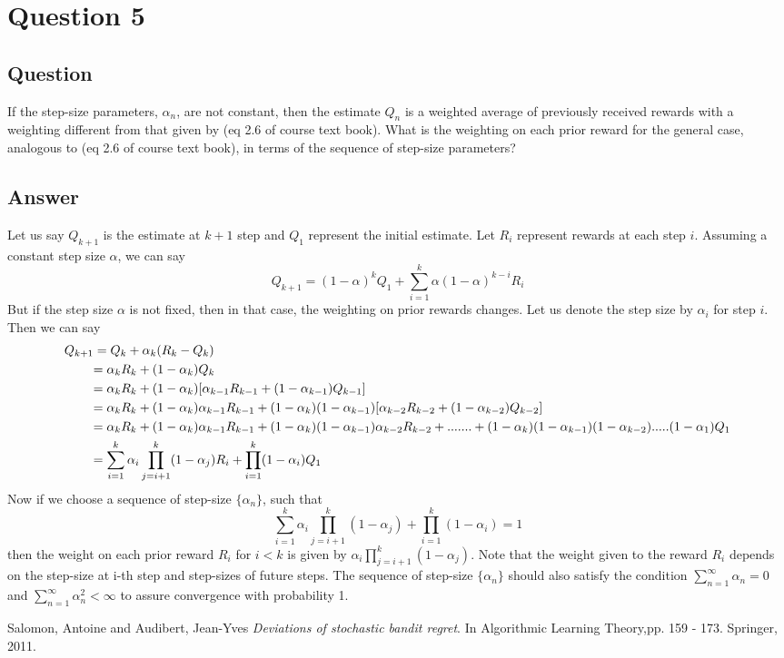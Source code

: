 \documentclass[english]{article}
\begin{document}
\section{Question 5}
\subsection{Question}
If the step-size parameters, $\alpha_{n}$, are not constant, then the estimate $Q_{n}$ is a weighted average of previously received rewards with a weighting different from that given by (eq 2.6 of course text book). What is the weighting on each prior reward for the general case, analogous to (eq 2.6 of course text book), in terms of the sequence of step-size parameters?
\subsection{Answer}
Let us say $Q_{k+1}$ is the estimate at $k + 1$ step and $Q_{1}$ represent the initial estimate. Let $R_{i}$ represent rewards at each step $i$. Assuming a constant step size $\alpha$, we can say
$$ Q_{k+1} = (1-\alpha)^{k}Q_{1} + \sum_{i=1}^{k}\alpha(1-\alpha)^{k-i}R_{i} $$
But if the step size $\alpha$ is not fixed, then in that case, the weighting on prior rewards changes. Let us denote the step size by $\alpha_{i}$ for step $i$. Then we can say
\begin{align*}
  \hspace{2em}&\hspace{-2em}Q_{k+1} = Q_{k} + \alpha_{k}(R_{k} - Q_{k}) \\
  &= \alpha_{k}R_{k} + (1 - \alpha_{k})Q_{k} \\
  &= \alpha_{k}R_{k} + (1 - \alpha_{k})[\alpha_{k-1}R_{k-1} + (1-\alpha_{k-1})Q_{k-1}] \\
  &= \alpha_{k}R_{k} + (1 - \alpha_{k})\alpha_{k-1}R_{k-1} + (1-\alpha_{k})(1 - \alpha_{k-1})[\alpha_{k-2}R_{k-2} + (1 - \alpha_{k-2})Q_{k-2}] \\
  &= \alpha_{k}R_{k} + (1-\alpha_{k})\alpha_{k-1}R_{k-1} + (1 - \alpha_{k})(1 - \alpha_{k-1})\alpha_{k-2}R_{k-2} + ....... + (1 - \alpha_{k})(1 - \alpha_{k-1})(1 - \alpha_{k-2}).....(1 - \alpha_{1})Q_{1} \\
  &= \sum_{i=1}^{k}\alpha_{i}\prod_{j=i+1}^{k}(1-\alpha_{j})R_{i} + \prod_{i=1}^{k}(1 - \alpha_{i})Q_{1}
\end{align*}
Now if we choose a sequence of step-size $\{\alpha_{n}\}$, such that 
$$ \sum_{i=1}^{k}\alpha_{i}\prod_{j=i+1}^{k}(1-\alpha_{j}) + \prod_{i=1}^{k}(1 - \alpha_{i}) = 1 $$ then the weight on each prior reward $R_{i}$ for $i < k$ is given by $\alpha_{i}\prod_{j=i+1}^{k}(1-\alpha_{j})$. Note that the weight given to the reward $R_{i}$ depends on the step-size at i-th step and step-sizes of future steps. The sequence of step-size $\{\alpha_{n}\}$ should also satisfy the condition $\sum_{n=1}^{\infty}\alpha_{n} = 0$ and $\sum_{n=1}^{\infty}\alpha_{n}^{2} < \infty$ to assure convergence with probability 1.

\begin{thebibliography}{9}
Salomon, Antoine and Audibert, Jean-Yves
\textit{Deviations of stochastic bandit regret}. 
In Algorithmic Learning Theory,pp. 159 - 173. Springer, 2011.
 
\end{thebibliography}
\end{document}
